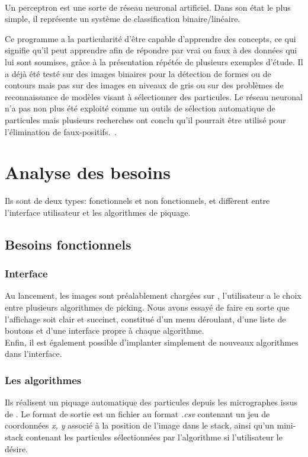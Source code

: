 \documentclass[11pt,a4paper]{report}
\begin{document}
\paragraph*{}
Un perceptron est une sorte de réseau neuronal artificiel. Dans son état le plus simple, il représente un système de classification binaire/linéaire.%

\noindent
Ce programme a la particularité d'être capable d'apprendre des concepts, ce qui signifie qu'il peut apprendre afin de répondre par vrai ou faux à des données qui lui sont soumises, gr\^ace à la présentation répétée de plusieurs exemples d'étude.
Il a déjà été testé sur des images binaires pour la détection de formes ou de contours mais pas sur des images en niveaux de gris ou sur des problèmes de reconnaissance de modèles visant à sélectionner des particules. Le réseau neuronal n'a pas non plus été exploité comme un outils de sélection automatique de particules mais plusieurs recherches ont conclu qu'il pourrait \^etre utilisé pour l'élimination de faux-positifs.~\cite{Perceptron:article}.%


\section{Analyse des besoins}
\noindent
Ils sont de deux types: fonctionnels et non fonctionnels, et diffèrent entre l'interface utilisateur et les algorithmes de piquage.
\subsection{Besoins fonctionnels}
\subsubsection{Interface}
\noindent
Au lancement, les images sont préalablement chargées sur \imj , l'utilisateur a le choix entre plusieurs algorithmes de picking. %
Nous avons essayé de faire en sorte que l'affichage soit clair et succinct, constitué d'un menu déroulant, d'une liste de boutons et d'une interface propre à chaque algorithme.\\
Enfin, il est également possible d'implanter simplement de nouveaux algorithmes dans l'interface. %

\subsubsection{Les algorithmes}
Ils réalisent un piquage automatique des particules depuis les micrographes issus de \cme. Le format de sortie est un fichier au format \emph{.csv} contenant un jeu de coordonnées \emph{x, y} associé à la position de l'image dans le stack, ainsi qu'un mini-stack contenant les particules sélectionnées par l'algorithme si l'utilisateur le désire.
\end{document}
